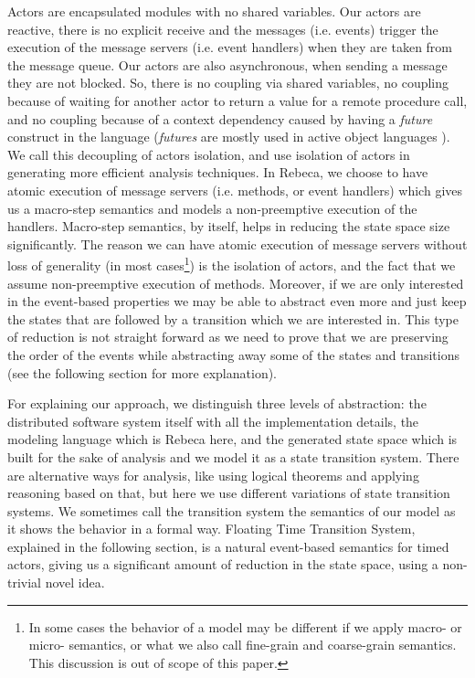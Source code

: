 Actors are encapsulated modules with no shared variables.
Our actors are reactive, there is no explicit receive and the messages (i.e. events) trigger the execution of the message servers (i.e. event handlers) when they are taken from the message queue.  Our actors are also asynchronous, when sending a message they are not blocked. 
So, there is no coupling via shared variables, no coupling because of waiting for another actor to return a value for a remote procedure call, and no coupling because of a context dependency caused by having a \textit{future}  construct in the language (\textit{futures} are mostly used in active object languages \cite{DBLP:journals/csur/BoerSHHRDJSKFY17}).
We call this decoupling of actors isolation, and use isolation of actors  in generating more efficient analysis techniques.
%
In Rebeca, we choose to have atomic execution of message servers (i.e. methods, or event handlers) which gives us a macro-step semantics and models a non-preemptive execution of the handlers.
Macro-step semantics, by itself, helps in reducing the state space size significantly.
The reason we can have atomic execution of message servers without loss of generality (in most cases\footnote{In some cases the behavior of a model may be different if we apply macro- or micro- semantics, or what we also call fine-grain and coarse-grain semantics. This discussion is out of scope of this paper.}) is the isolation of actors, and the fact that we assume non-preemptive execution of methods.
%
Moreover, if we are only interested in the event-based properties we may be able to abstract even more and just keep the states that are followed by a transition which we are interested in. This type of reduction is not straight forward as we need to prove that we are preserving the order of the events while abstracting away some of the states and transitions (see the following section for more explanation). 

For explaining our approach, we distinguish three levels of abstraction: the distributed software system itself with all the implementation details, the modeling language which is Rebeca here, and the generated state space which is built for the sake of analysis and  we model it as a state transition system. There are alternative ways for analysis, like using logical theorems and applying reasoning based on that, but here we use different variations of state transition systems.
We sometimes call the transition system the semantics of our model as it shows the behavior in a formal way.
%
Floating Time Transition System, explained in the following section, is a natural event-based semantics for timed actors, giving us a significant amount of reduction in the state space, using a non-trivial novel idea.
	